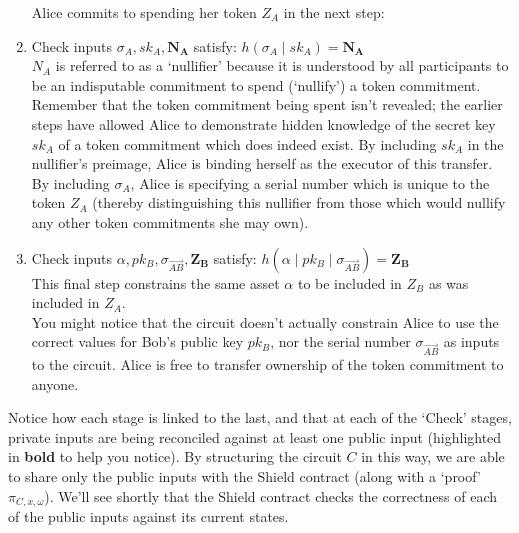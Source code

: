 \begin{enumerate}
  Alice commits to spending her token $Z_A$ in the next step:
  \item Check inputs $\sigma_{A}, sk_A, \bm{N_A}$ satisfy:
    $h(\sigma_{A}\;|\;sk_A) = \bm{N_{A}}$\\
    $N_A$ is referred to as a `nullifier' because it is understood by all participants to be an indisputable commitment to spend (`nullify') a token commitment. Remember that the token commitment being spent isn't revealed; the earlier steps have allowed Alice to demonstrate hidden knowledge of the secret key $sk_A$ of a token commitment which does indeed exist. By including $sk_A$ in the nullifier's preimage, Alice is binding herself as the executor of this transfer. By including $\sigma_A$, Alice is specifying a serial number which is unique to the token $Z_A$ (thereby distinguishing this nullifier from those which would nullify any other token commitments she may own).\\
  \item Check inputs $\alpha, pk_B, \sigma_{\vec{AB}}, \bm{Z_B}$ satisfy:
    $h(\alpha\;|\;pk_B\;|\;\sigma_{\vec{AB}}) = \bm{Z_B}$\\
    This final step constrains the same asset $\alpha$ to be included in $Z_B$ as was included in $Z_A$.\\
    You might notice that the circuit doesn't actually constrain Alice to use the correct values for Bob's public key $pk_B$, nor the serial number $\sigma_{\vec{AB}}$ as inputs to the circuit. Alice is free to transfer ownership of the token commitment to anyone.
\end{enumerate}
Notice how each stage is linked to the last, and that at each of the `Check' stages, private inputs are being reconciled against at least one public input (highlighted in \textbf{bold} to help you notice). By structuring the circuit $C$ in this way, we are able to share only the public inputs with the Shield contract (along with a `proof' $\pi_{C,x,\omega}$). We'll see shortly that the Shield contract checks the correctness of each of the public inputs against its current states.\\
\\

